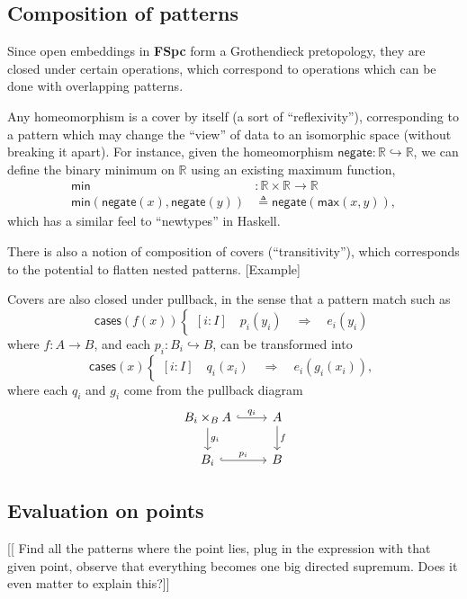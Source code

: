 \documentclass[conference]{IEEEtran}
\newcommand{\hookto}{\hookrightarrow}
\newcommand{\R}{\mathbb{R}}
\newcommand{\negate}{\mathsf{negate}}
\newcommand{\Branch}{\Rightarrow}
\begin{document}
\subsection{Composition of patterns}

Since open embeddings in \textbf{FSpc} form a Grothendieck pretopology, they are closed under certain operations, which correspond to operations which can be done with overlapping patterns.

Any homeomorphism is a cover by itself (a sort of ``reflexivity''), corresponding to a pattern which may change the ``view'' of data to an isomorphic space (without breaking it apart). For instance, given the homeomorphism $\negate : \R \hookto \R$, we can define the binary minimum on $\R$ using an existing maximum function,
\begin{align*}
\mathsf{min} &: \R \times \R \to \R
\\ \mathsf{min}(\negate(x), \negate(y)) &\triangleq \negate(\mathsf{max}(x, y)),
\end{align*}
which has a similar feel to ``newtypes'' in Haskell.

There is also a notion of composition of covers (``transitivity''), which corresponds to the potential to flatten nested patterns.
[Example]

Covers are also closed under pullback, in the sense that a pattern match such as
\[
\mathsf{cases}(f(x))
\begin{cases}
[i : I] \quad p_i(y_i) \quad \Branch \quad e_i(y_i)
\end{cases}
\]
where $f : A \to B$, and each $p_i : B_i \hookto B$,
can be transformed into
\[
\mathsf{cases}(x)
\begin{cases}
[i : I] \quad q_i(x_i) \quad \Branch \quad e_i(g_i(x_i)),
\end{cases}
\]
where each $q_i$ and $g_i$ come from the pullback diagram
\begin{equation*}
\begin{tikzcd}
B_i \times_B A \arrow[r, hook, "q_i"]
   \arrow[d, "g_i"]
& A \arrow[d, "f"]
\\ B_i \arrow[r, hook, "p_i"]
& B
\end{tikzcd}
\end{equation*}

\subsection{Evaluation on points}

[[ Find all the patterns where the point lies, plug in the expression with that given point, observe that everything becomes one big directed supremum. Does it even matter to explain this?]]
\end{document}
